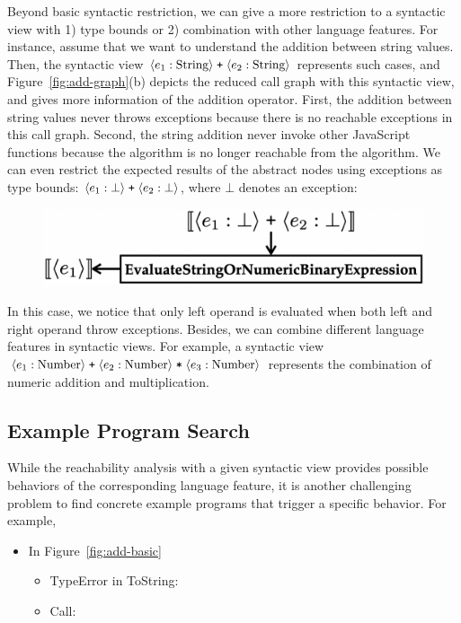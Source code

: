 Beyond basic syntactic restriction, we can give a more restriction to a
syntactic view with 1) type bounds or 2) combination with other language
features.  For instance, assume that we want to understand the addition between
string values.  Then, the syntactic view $\langle e_1: \text{String} \rangle \;
\texttt{+} \; \langle e_2: \text{String} \rangle$ represents such cases, and
Figure~\ref{fig:add-graph}(b) depicts the reduced call graph with this syntactic
view, and gives more information of the addition operator.  First, the addition
between string values never throws exceptions because there is no reachable
exceptions in this call graph.  Second, the string addition never invoke other
JavaScript functions because the  algorithm is no longer reachable
from the  algorithm.  We can even restrict the expected
results of the abstract nodes using exceptions as type bounds: $\langle e_1:
\bot \rangle \; \texttt{+} \; \langle e_2: \bot \rangle$, where $\bot$ denotes an exception:
\begin{figure}[H]
  \centering
  \includegraphics[width=.7\columnwidth]{img/add-exc.png}
\end{figure} \noindent
In this case, we notice that only left operand is evaluated when both left and
right operand throw exceptions.  Besides, we can combine different language
features in syntactic views.  For example, a syntactic view $\langle e_1:
\text{Number} \rangle \; \texttt{+} \; \langle e_2: \text{Number} \rangle \; \texttt{*} \;
\langle e_3: \text{Number} \rangle$ represents the combination of numeric addition
and multiplication.





\subsection{Example Program Search}\label{sec:reduce-spec}

While the reachability analysis with a given syntactic view provides possible
behaviors of the corresponding language feature, it is another challenging
problem to find concrete example programs that trigger a specific behavior.  For
example,


\begin{itemize}
  \item In Figure~\ref{fig:add-basic}
    \begin{itemize}
      \item TypeError in ToString:
      \item Call:
    \end{itemize}
\end{itemize}
